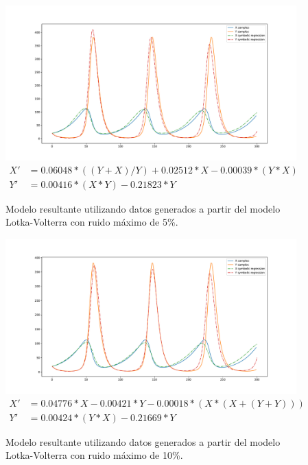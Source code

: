 \begin{figure}[h]
    \centering
    \includegraphics[width=\textwidth]{"figures/final_plot_LV_0.05.pdf"}
    \begin{align*}
        X' & = 0.06048 * ((Y + X) / Y) + 0.02512 * X -0.00039 * (Y * X) \\
        Y' & = 0.00416 * (X * Y) -0.21823 * Y
    \end{align*}
    \caption{Modelo resultante utilizando datos generados a partir del modelo Lotka-Volterra con ruido máximo de 5\%.}
    \label{fig:final_plot_LV_0.05}
\end{figure}

\begin{figure}[h]
    \centering
    \includegraphics[width=\textwidth]{"figures/final_plot_LV_0.1.pdf"}
    \begin{align*}
        X' & = 0.04776 * X -0.00421 * Y -0.00018 * (X * (X + (Y + Y))) \\
        Y' & = 0.00424 * (Y * X) -0.21669 * Y
    \end{align*}
    \caption{Modelo resultante utilizando datos generados a partir del modelo Lotka-Volterra con ruido máximo de 10\%.}
    \label{fig:final_plot_LV_0.1}
\end{figure}


